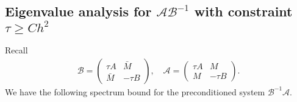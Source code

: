 \documentclass[smallcondensed]{svjour3}
\numberwithin{equation}{section} \numberwithin{table}{section}
\numberwithin{figure}{section}
\numberwithin{algorithm}{section}
\begin{document}
\subsection{Eigenvalue analysis for $\mathcal{A}\mathcal{B}^{-1}$ with constraint $\tau \geq Ch^2$ }
 
Recall
\begin{align*}
 \mathcal{B} = 
 \begin{pmatrix}
 \tau A & \bar M\\
\bar M & -\tau B
\end{pmatrix},
\quad
 \mathcal{A} = 
 \begin{pmatrix}
 \tau A &  M\\
 M & -\tau B
\end{pmatrix}.
 \end{align*}
 We have the following spectrum bound for the preconditioned system $\mathcal{B}^{-1}\mathcal{A}$.
 
\end{document}
